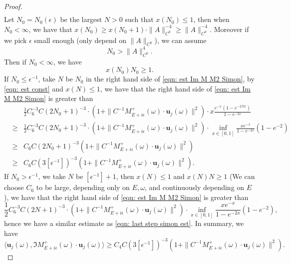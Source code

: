 \documentclass[11pt]{amsart}
\theoremstyle{remark}
\theoremstyle{definition}
\begin{document}
\begin{proof}
\begin{eqnarray*}
\end{eqnarray*}
Let $N_0=N_0(\epsilon)$ be the largest $N>0$ such that $x(N_0)\leq 1$, then when $N_0<\infty$, we have that $x(N_0)\geq x(N_0+1)\cdot \|A\|_{C^0}^{-4}\geq \|A\|_{C^0}^{-4}$. Moreover if we pick $\epsilon$ small enough (only depend on $\|A\|_{C^0}$), we can assume 
\begin{equation*}
N_0> \|A\|_{C^0}^4.
\end{equation*}
Then if $N_0<\infty$, we have 
\begin{equation}\label{eqn: est const}
 x(N_0)N_0\geq 1.
\end{equation}
If $N_0\leq \epsilon^{-1}$, take $N$ be $N_0$ in the right hand side of \eqref{eqn: est Im M M2 Simon}, by \eqref{eqn: est const} and $x(N)\leq 1$, we have that the right hand side of \eqref{eqn: est Im M M2 Simon} is greater than 
\begin{eqnarray}
&& \frac{1}{2}  C_6^{-3}C(2N_0+1)^{-3} \cdot (1+\|C^{-1}M_{E+i\epsilon}^+(\omega)\cdot \mathbf{u}_j(\omega)\|^2)\cdot x\frac{e^{-x}(1-e^{-2Nx})}{1-e^{-2x}} \nonumber\\
&\geq& \frac{1}{2}  C_6^{-3}C(2N_0+1)^{-3} \cdot (1+\|C^{-1}M_{E+i\epsilon}^+(\omega)\cdot \mathbf{u}_j(\omega)\|^2)\cdot 
\inf_{x\in[0,1]}\frac{xe^{-x}}{1-e^{-2x}}(1-e^{-2})\nonumber\\
&\geq &C_6 C(2N_0+1)^{-3}(1+\|C^{-1}M_{E+i\epsilon}^+(\omega)\cdot \mathbf{u}_j(\omega)\|^2)\ \nonumber\\
&\geq & C_6 C(3[\epsilon^{-1}])^{-3}(1+\|C^{-1}M_{E+i\epsilon}^+(\omega)\cdot \mathbf{u}_j(\omega)\|^2) .\label{eqn: last step simon est}
\end{eqnarray}
If $N_0>\epsilon^{-1}$, we take $N$ be $[\epsilon^{-1}]+1$, then $x(N)\leq 1$ and $x(N)N\geq 1$ (We can choose $C_6$ to be large, depending only on $E, \omega$, and continuously depending on $E$), we have that the right hand side of \eqref{eqn: est Im M M2 Simon} is greater than
$$\frac{1}{2}  C_6^{-3}C(2N+1)^{-3} \cdot (1+\|C^{-1}M_{E+i\epsilon}^+(\omega)\cdot \mathbf{u}_j(\omega)\|^2)\cdot 
\inf_{x\in[0,1]}\frac{xe^{-x}}{1-e^{-2x}}(1-e^{-2})\nonumber,$$
hence we have a similar estimate as \eqref{eqn: last step simon est}. In summary, we have 
\begin{equation}\label{eqn: est spec H+}
\langle\mathbf{u}_j(\omega), \Im M_{E+i\epsilon}^+(\omega)\cdot \mathbf{u}_j(\omega)\rangle \geq C_4 C(3[\epsilon^{-1}])^{-3}(1+\|C^{-1}M_{E+i\epsilon}^+(\omega)\cdot \mathbf{u}_j(\omega)\|^2).
\end{equation}



\end{proof}
\end{document}
